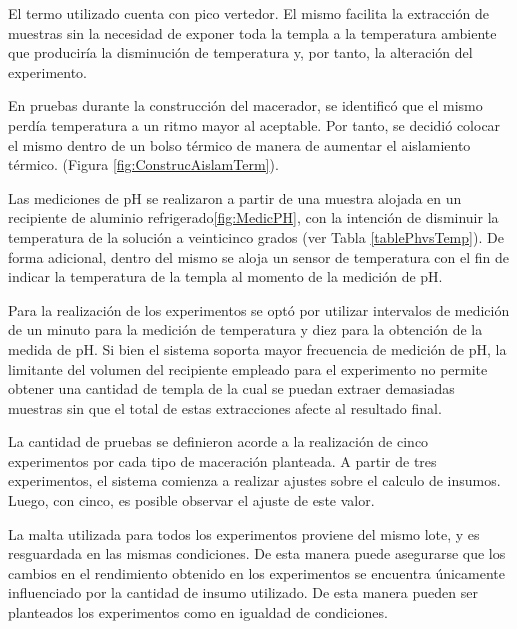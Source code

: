         \par El termo utilizado cuenta con pico vertedor. El mismo facilita la extracción de muestras sin la necesidad de exponer toda la templa a la temperatura ambiente que produciría la disminución de temperatura y, por tanto, la alteración del experimento.
        
        \par En pruebas durante la construcción del macerador, se identificó que el mismo perdía temperatura a un ritmo mayor al aceptable. Por tanto, se decidió colocar el mismo dentro de un bolso térmico de manera de aumentar el aislamiento térmico. (Figura \ref{fig:ConstrucAislamTerm}).
        
        \par Las mediciones de pH se realizaron a partir de una muestra alojada en un recipiente de aluminio refrigerado\ref{fig:MedicPH}, con la intención de disminuir la temperatura de la solución a veinticinco grados (ver Tabla \ref{tablePhvsTemp}). De forma adicional, dentro del mismo se aloja un sensor de temperatura con el fin de indicar la temperatura de la templa al momento de la medición de pH.
        
        \par Para la realización de los experimentos se optó por utilizar intervalos de medición de un minuto para la medición de temperatura y diez para la obtención de la medida de pH. Si bien el sistema soporta mayor frecuencia de medición de pH, la limitante del volumen del recipiente empleado para el experimento no permite obtener una cantidad de templa de la cual se puedan extraer demasiadas muestras sin que el total de estas extracciones afecte al resultado final.
        
        \par La cantidad de pruebas se definieron acorde a la realización de cinco experimentos por cada tipo de maceración planteada. A partir de tres experimentos, el sistema comienza a realizar ajustes sobre el calculo de insumos. Luego, con cinco, es posible observar el ajuste de este valor.
        
        \par La malta utilizada para todos los experimentos proviene del mismo lote, y es resguardada en las mismas condiciones. De esta manera puede asegurarse que los cambios en el rendimiento obtenido en los experimentos se encuentra únicamente influenciado por la cantidad de insumo utilizado. De esta manera pueden ser planteados los experimentos como en igualdad de condiciones.
        
